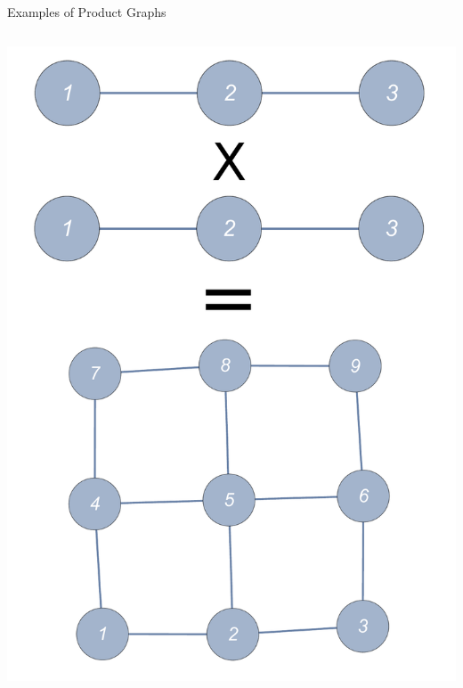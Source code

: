 \documentclass{beamer}
\begin{document}
\begin{frame}{Examples of Product Graphs}
	\begin{columns}[T]
		\begin{column}{0.33\textwidth}
			\centering
   			\includegraphics[width=\textwidth]{Images/graphprod_chain3_square}
		\end{column}
\end{columns}
\end{frame}
\end{document}

